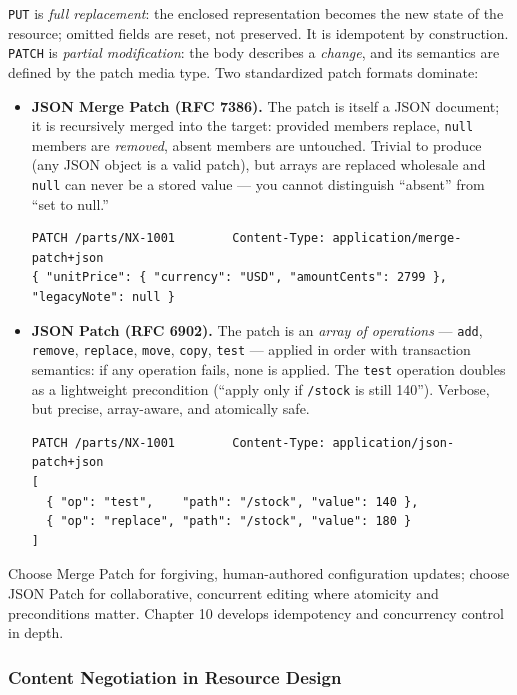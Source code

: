 \texttt{PUT} is \emph{full replacement}: the enclosed representation becomes the
new state of the resource; omitted fields are reset, not preserved. It is
idempotent by construction. \texttt{PATCH} is \emph{partial modification}:
the body describes a \emph{change}, and its semantics are defined by the patch
media type. Two standardized patch formats dominate:

\begin{itemize}
  \item \textbf{JSON Merge Patch (RFC 7386).} The patch is itself a JSON
        document; it is recursively merged into the target: provided members
        replace, \texttt{null} members are \emph{removed}, absent members are
        untouched. Trivial to produce (any JSON object is a valid patch), but
        arrays are replaced wholesale and \texttt{null} can never be a stored
        value --- you cannot distinguish ``absent'' from ``set to null.''
\begin{verbatim}
PATCH /parts/NX-1001        Content-Type: application/merge-patch+json
{ "unitPrice": { "currency": "USD", "amountCents": 2799 }, "legacyNote": null }
\end{verbatim}
  \item \textbf{JSON Patch (RFC 6902).} The patch is an \emph{array of
        operations} --- \texttt{add}, \texttt{remove}, \texttt{replace},
        \texttt{move}, \texttt{copy}, \texttt{test} --- applied in order with
        transaction semantics: if any operation fails, none is applied. The
        \texttt{test} operation doubles as a lightweight precondition
        (``apply only if \texttt{/stock} is still 140''). Verbose, but precise,
        array-aware, and atomically safe.
\begin{verbatim}
PATCH /parts/NX-1001        Content-Type: application/json-patch+json
[
  { "op": "test",    "path": "/stock", "value": 140 },
  { "op": "replace", "path": "/stock", "value": 180 }
]
\end{verbatim}
\end{itemize}

Choose Merge Patch for forgiving, human-authored configuration updates; choose
JSON Patch for collaborative, concurrent editing where atomicity and
preconditions matter. Chapter 10 develops idempotency and concurrency control
in depth.

\subsubsection{Content Negotiation in Resource Design}

